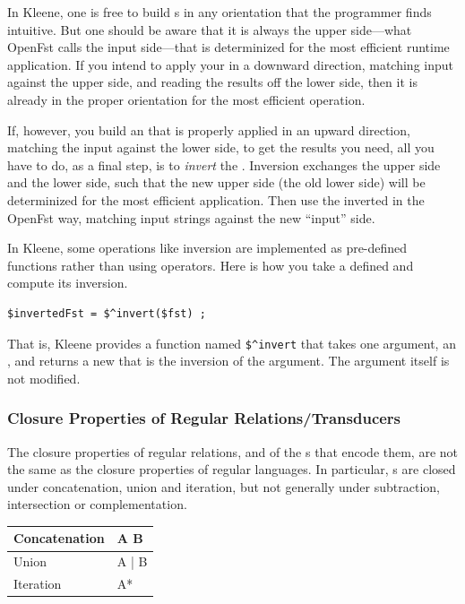 In Kleene, one is free to build \fst{}s in any orientation that the
programmer finds intuitive.  But one should be aware that it is always
the upper side---what OpenFst calls the input side---that is determinized
for the most efficient runtime application.  If you intend to apply
	your  \fst{} in a downward direction, matching input against the
	upper side, and reading the results off the lower side, then it is
	already in the proper orientation for the most efficient operation.  
	
If, however, you build an \fst{}
that is properly applied in an upward direction, matching the input
against the lower side, to get the results you need, all you have to do,
as a final step, is to \emph{invert} the \fst{}.  Inversion exchanges the upper
side and the lower side, such that the new upper side (the old lower
side) will be determinized for the most efficient application.  Then use
the inverted \fst{} in the OpenFst way, matching input strings against the
new ``input'' side.

In Kleene, some operations like inversion are implemented as pre-defined
functions rather than using operators.  Here is how you take a defined
\fst{} and compute its inversion.

\begin{Verbatim}
$invertedFst = $^invert($fst) ;
\end{Verbatim}

\noindent
That is, Kleene provides a function named \verb!$^invert! that takes one argument, an \fst, and
returns a new \fst{} that is the inversion of the argument.  The argument itself is not modified. 

\subsubsection{Closure Properties of Regular Relations/Transducers}

The closure properties of regular relations, and of the \fst{}s that encode them, are not
the same as the closure properties of regular languages.  In particular, \fst{}s are closed
under concatenation, union and iteration, but not generally under subtraction, intersection
or complementation.

\vspace{4mm}

\begin{tabular}{|l|l|}
\hline
Concatenation 	& A B \\
\hline
Union         	& A | B \\
\hline
Iteration	  	& A*\\
\hline
\end{tabular}

